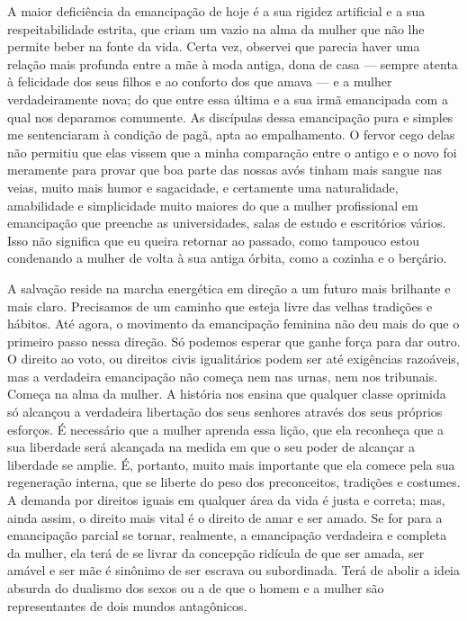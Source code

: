 A maior deficiência da emancipação de hoje é a sua rigidez artificial e
a sua respeitabilidade estrita, que criam um vazio na alma da mulher que
não lhe permite beber na fonte da vida. Certa vez, observei que parecia
haver uma relação mais profunda entre a mãe à moda antiga, dona de casa ---\label{mae}
sempre atenta à felicidade dos seus filhos e ao conforto dos que
amava --- e a mulher verdadeiramente nova; do que entre essa última e a sua
irmã emancipada com a qual nos deparamos comumente. As discípulas dessa
emancipação pura e simples me sentenciaram à condição de pagã, apta ao
empalhamento. O fervor cego delas não permitiu que elas vissem que a
minha comparação entre o antigo e o novo foi meramente para provar que
boa parte das nossas avós tinham mais sangue nas veias, muito mais humor
e sagacidade, e certamente uma naturalidade, amabilidade e simplicidade
muito maiores do que a mulher profissional em emancipação que preenche
as universidades, salas de estudo e escritórios vários. Isso não
significa que eu queira retornar ao passado, como tampouco estou condenando a mulher de volta à sua antiga órbita, como a cozinha e o berçário.

A salvação reside na marcha energética em direção a um futuro mais
brilhante e mais claro. Precisamos de um caminho que esteja livre das
velhas tradições e hábitos. Até agora, o movimento da emancipação
feminina não deu mais do que o primeiro passo nessa direção. Só podemos
esperar que ganhe força para dar outro. O direito ao voto, ou direitos
civis igualitários podem ser até exigências razoáveis, mas a verdadeira
emancipação não começa nem nas urnas, nem nos tribunais. Começa na alma
da mulher. A história nos ensina que qualquer classe oprimida só
alcançou a verdadeira libertação dos seus senhores através dos seus
próprios esforços. É necessário que a mulher aprenda essa lição, que ela
reconheça que a sua liberdade será alcançada na medida em que o seu
poder de alcançar a liberdade se amplie. É, portanto, muito mais
importante que ela comece pela sua regeneração interna, que se liberte
do peso dos preconceitos, tradições e costumes. A demanda por direitos
iguais em qualquer área da vida é justa e correta; mas, ainda assim, o
direito mais vital é o direito de amar e ser amado. Se for para a
emancipação parcial se tornar, realmente, a emancipação verdadeira e
completa da mulher, ela terá de se livrar da concepção ridícula de que
ser amada, ser amável e ser mãe é sinônimo de ser escrava ou
subordinada. Terá de abolir a ideia absurda do dualismo dos sexos ou a
de que o homem e a mulher são representantes de dois mundos antagônicos.

